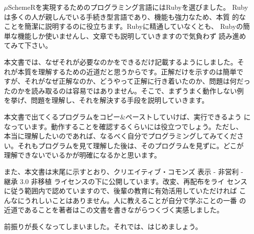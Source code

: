 $\mu$SchemeRを実現するためのプログラミング言語にはRubyを選びました。
Rubyは多くの人が親しんでいる手続き型言語であり、機能も強力なため、本質
的なことを簡潔に説明するのに役立ちます。Rubyに精通していなくとも、
Rubyの簡単な機能しか使いませんし、文章でも説明していきますので気負わず
読み進めてみて下さい。

本文書では、なぜそれが必要なのかをできるだけ記載するようにしました。そ
れが本質を理解するための近道だと思うからです。正解だけを示すのは簡単で
すが、それがなぜ正解なのか、どうやって正解に行き着いたのか、問題は何だっ
たのかを読み取るのは容易ではありません。そこで、まずうまく動作しない例
を挙げ、問題を理解し、それを解決する手段を説明していきます。

本文書で出てくるプログラムをコピー$\&$ペーストしていけば、実行できるよう
になっています。動作することを確認するくらいには役立つでしょう。ただし、
本当に理解したいのであれば、なるべく自分でプログラミングしてみてくださ
い。それもプログラムを見て理解した後は、そのプログラムを見ずに。どこが
理解できないでいるかが明確になるかと思います。

また、本文書は末尾に示すとおり、クリエイティブ・コモンズ 表示 - 非営利
- 継承 3.0 非移植 ライセンスの下に公開しています。改変、再配布をライ
センスに従う範囲内で認めていますので、後輩の教育に有効活用していただければ
こんなにうれしいことはありません。人に教えることが自分で学ぶことの一番
の近道であることを著者はこの文書を書きながらつくづく実感しました。

前振りが長くなってしまいました。それでは、はじめましょう。
